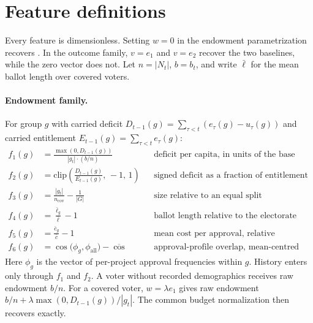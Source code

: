 \section{Feature definitions}
\label{app:features}

Every feature is dimensionless. Setting $w=0$ in the endowment parametrization
recovers \MES. In the outcome family, $v=e_1$ and $v=e_2$ recover the two
baselines, while the zero vector does not. Let $n = |N_t|$, $b = b_t$, and
write $\bar{\ell}$ for the mean ballot length over covered voters.

\paragraph{Endowment family.}
For group $g$ with carried deficit $D_{t-1}(g) = \sum_{\tau<t}(e_\tau(g) - u_\tau(g))$
and carried entitlement $E_{t-1}(g) = \sum_{\tau<t} e_\tau(g)$:
\begin{align*}
f_1(g) &= \frac{\max(0, D_{t-1}(g))}{|g_t| \cdot (b/n)}
  &&\text{deficit per capita, in units of the base endowment}\\
f_2(g) &= \mathrm{clip}\!\left(\frac{D_{t-1}(g)}{E_{t-1}(g)},\, -1,\, 1\right)
  &&\text{signed deficit as a fraction of entitlement owed}\\
f_3(g) &= \frac{|g_t|}{n_{\mathrm{cov}}} - \frac{1}{|G|}
  &&\text{size relative to an equal split}\\
f_4(g) &= \frac{\bar{\ell}_g}{\bar{\ell}} - 1
  &&\text{ballot length relative to the electorate}\\
f_5(g) &= \frac{\bar{c}_g}{\bar{c}} - 1
  &&\text{mean cost per approval, relative}\\
f_6(g) &= \cos\!\big(\phi_g, \phi_{\mathrm{all}}\big) - \overline{\cos}
  &&\text{approval-profile overlap, mean-centred over groups}
\end{align*}
Here $\phi_g$ is the vector of per-project approval frequencies within $g$.
History enters only through $f_1$ and $f_2$. A voter without recorded
demographics receives raw endowment $b/n$. For a covered voter,
$w = \lambda e_1$ gives raw endowment
$b/n + \lambda \max(0, D_{t-1}(g))/|g_t|$. The common budget normalization then
recovers \RES{} exactly.


